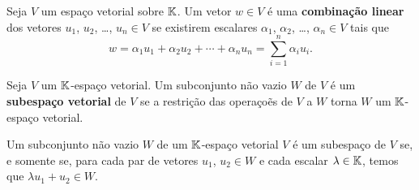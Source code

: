 \documentclass{beamer}
\begin{document}
    \begin{frame}
        \begin{definicao}
	        Seja $V$ um espa\c{c}o vetorial sobre $\mathbb{K}$.
	        Um vetor $w \in V$ \'e uma \textbf{combina\c{c}\~ao linear} dos vetores $u_1$, $u_2$, \dots, $u_n \in V$ se existirem escalares $\alpha_1$, $\alpha_2$, \dots, $\alpha_n \in V$ tais que
    	    \[
	    	    w = \alpha_1 u_1 + \alpha_2u_2 + \cdots + \alpha_nu_n = \sum_{i = 1}^n \alpha_iu_i.
        	\]
        \end{definicao}
    \end{frame}

    \begin{frame}
        \begin{definicao}
        	Seja $V$ um $\mathbb{K}$-espa\c{c}o vetorial. Um subconjunto n\~ao vazio $W$ de $V$ \'e um \textbf{subespa\c{c}o vetorial} de $V$ se a restri\c{c}\~ao das opera\c{c}o\~es de $V$ a $W$ torna $W$ um $\mathbb{K}$-espa\c{c}o vetorial.
        \end{definicao}
        
        \begin{teorema}
        	Um subconjunto n\~ao vazio $W$ de um $\mathbb{K}$-espa\c{c}o vetorial $V$ \'e um subespa\c{c}o de $V$ se, e somente se, para cada par de vetores $u_1$, $u_2 \in W$ e cada escalar $\lambda \in \mathbb{K}$, temos que $\lambda u_1 + u_2 \in W$.
        \end{teorema}
    \end{frame}
\end{document}
